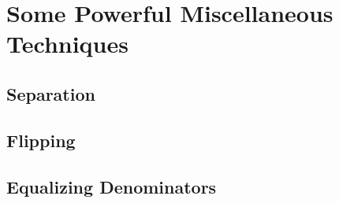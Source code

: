 \documentclass[inequalities.tex]{subfile}
\begin{document}
	\chapter[Miscellaneous]{Some Powerful Miscellaneous Techniques}
	
	\section{Separation}
	
	\section{Flipping}
	
	\section{Equalizing Denominators}
\end{document}
